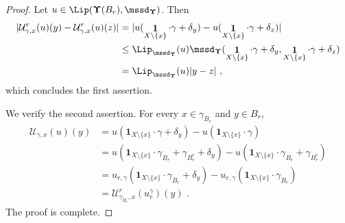 \documentclass[11pt,letterpaper]{amsart}
\newcommand{\set}[1]{\left\{#1\right\}}							%
\DeclareMathOperator{\car}{\mathbf 1}
\newcommand{\R}{{\mathbb R}}
\newcommand{\comma}{\,\,\mathrm{,}\;\,}
\newcommand{\fstop}{\,\,\mathrm{.}}
\newcommand{\dUpsilon}{{\mathbf \Upsilon}}
\newcommand{\U}{\dUpsilon}
\renewcommand{\1}{\mathbf 1}
\numberwithin{equation}{section}
\theoremstyle{plain}
\newtheorem{lem}[thm]{Lemma}%
\theoremstyle{definition}
\theoremstyle{remark}
\begin{document}
\begin{proof}
 Let $u \in \Lip(\U(B_r), \mssd_\U)$. Then
\begin{align*} %
|\mathcal U^r_{\gamma, x}(u)(y)- \mathcal U^r_{\gamma, x}(u)(z)| &= |u(\car_{X\setminus\set{x}}\cdot\gamma + \delta_y)-u(\car_{X\setminus\set{x}}\cdot\gamma + \delta_z)|
\\
& \le \Lip_{\mssd_{\U}}(u)\mssd_\U(\car_{X\setminus\set{x}}\cdot\gamma + \delta_y, \car_{X\setminus\set{x}}\cdot\gamma + \delta_z) \notag
\\
&= \Lip_{\mssd_{\U}}(u) |y-z| \comma \notag
\end{align*}
which concludes the first assertion. 

We verify the second assertion.
For every $x \in \gamma_{B_r}$ and $y \in B_r$, 
\begin{align*}
 \mathcal U_{\gamma, x}(u)(y)& = u(\1_{X \setminus \{x\}} \cdot \gamma + \delta_y)- u(\1_{X \setminus \{x\}} \cdot \gamma)
 \\
 &  = u(\1_{X \setminus \{x\}} \cdot \gamma_{B_r} + \gamma_{B_r^c}+ \delta_y)- u(\1_{X \setminus \{x\}} \cdot \gamma_{B_r} + \gamma_{B_r^c})
 \\
 &= u_{r, \gamma}(\1_{X \setminus \{x\}} \cdot \gamma_{B_r}+ \delta_y)- u_{r, \gamma}(\1_{X \setminus \{x\}} \cdot \gamma_{B_r})
 \\
 &=\mathcal U^r_{\gamma_{B_r}, x}(u_{r}^\gamma)(y) \fstop
\end{align*}
The proof is complete.
\end{proof}

%
\end{document}
